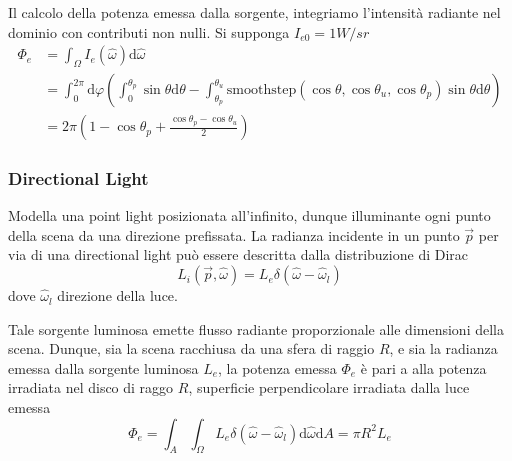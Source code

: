 Il calcolo della potenza emessa dalla sorgente, integriamo l'intensit\`a radiante nel dominio con contributi non nulli. Si supponga 
\mbox{$I_{e0}=1 \si{W/sr}$}
\begin{align}
	\Phi_e&=\int_{\Omega}I_e(\hat{\omega})\mathrm{d}\hat{\omega} \nonumber\\
		&=\int_0^{2\pi}\mathrm{d}\varphi\left(\int_0^{\theta_p}\sin\theta\mathrm{d}\theta-\int_{\theta_p}^{\theta_u}
			\mathrm{smoothstep}(\cos\theta,\cos\theta_u,\cos\theta_p)\sin\theta\mathrm{d}\theta\right) \nonumber \\
	&=2\pi\left(1-\cos\theta_p+\frac{\cos\theta_p-\cos\theta_u}{2}\right)
\end{align}
\subsubsection{Directional Light}
Modella una point light posizionata all'infinito, dunque illuminante ogni punto della scena da una direzione prefissata. La radianza incidente in un 
punto $\vec{p}$ per via di una directional light pu\`o essere descritta dalla distribuzione di Dirac
\begin{equation}
	L_i(\vec{p},\hat{\omega})=L_e\delta(\hat{\omega}-\hat{\omega}_l)
\end{equation}
dove $\hat{\omega}_l$ direzione della luce.\par
Tale sorgente luminosa emette flusso radiante proporzionale alle dimensioni della scena. Dunque, sia la scena racchiusa da una sfera di raggio $R$,
e sia la radianza emessa dalla sorgente luminosa $L_e$, la potenza emessa $\Phi_e$ \`e pari a alla potenza irradiata nel disco di raggo $R$, superficie
perpendicolare irradiata dalla luce emessa
\begin{equation}
	\Phi_e=\int_A\int_{\Omega}L_e\delta(\hat{\omega}-\hat{\omega}_l)\mathrm{d}\hat{\omega}\mathrm{d}A=\pi R^2L_e
\end{equation}
